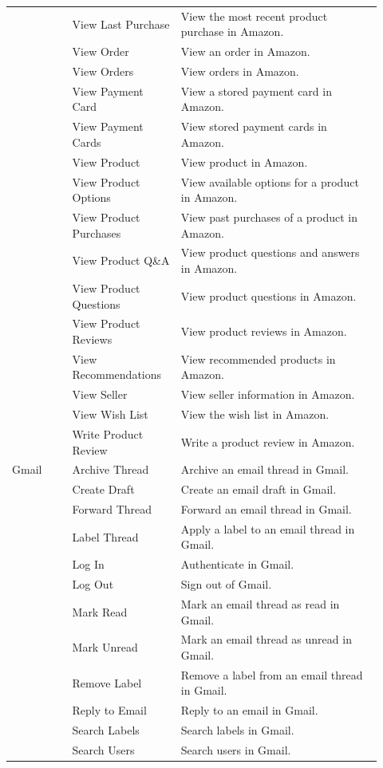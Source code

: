 \begin{longtable}{@{}p{0.15\linewidth}p{0.27\linewidth}p{0.50\linewidth}@{}}
 & View Last Purchase & View the most recent product purchase in Amazon. \\
 & View Order & View an order in Amazon. \\
 & View Orders & View orders in Amazon. \\
 & View Payment Card & View a stored payment card in Amazon. \\
 & View Payment Cards & View stored payment cards in Amazon. \\
 & View Product & View product in Amazon. \\
 & View Product Options & View available options for a product in Amazon. \\
 & View Product Purchases & View past purchases of a product in Amazon. \\
 & View Product Q\&A & View product questions and answers in Amazon. \\
 & View Product Questions & View product questions in Amazon. \\
 & View Product Reviews & View product reviews in Amazon. \\
 & View Recommendations & View recommended products in Amazon. \\
 & View Seller & View seller information in Amazon. \\
 & View Wish List & View the wish list in Amazon. \\
 & Write Product Review & Write a product review in Amazon. \\
\midrule
Gmail & Archive Thread & Archive an email thread in Gmail. \\
 & Create Draft & Create an email draft in Gmail. \\
 & Forward Thread & Forward an email thread in Gmail. \\
 & Label Thread & Apply a label to an email thread in Gmail. \\
 & Log In & Authenticate in Gmail. \\
 & Log Out & Sign out of Gmail. \\
 & Mark Read & Mark an email thread as read in Gmail. \\
 & Mark Unread & Mark an email thread as unread in Gmail. \\
 & Remove Label & Remove a label from an email thread in Gmail. \\
 & Reply to Email & Reply to an email in Gmail. \\
 & Search Labels & Search labels in Gmail. \\
 & Search Users & Search users in Gmail. \\

\end{longtable}
